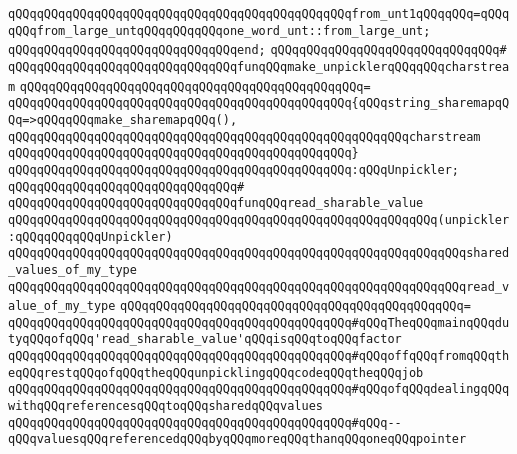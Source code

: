 \verb|qQQqqQQqqQQqqQQqqQQqqQQqqQQqqQQqqQQqqQQqqQQqqQQqfrom_unt1qQQqqQQq=qQQqqQQqfrom_large_untqQQqqQQqqQQqone_word_unt::from_large_unt;|\newline
\newline
\verb|qQQqqQQqqQQqqQQqqQQqqQQqqQQqqQQqend;|\newline
\newline
\verb|qQQqqQQqqQQqqQQqqQQqqQQqqQQqqQQq#|\newline
\verb|qQQqqQQqqQQqqQQqqQQqqQQqqQQqqQQqfunqQQqmake_unpicklerqQQqqQQqcharstream|\newline
\verb|qQQqqQQqqQQqqQQqqQQqqQQqqQQqqQQqqQQqqQQqqQQqqQQq=|\newline
\verb|qQQqqQQqqQQqqQQqqQQqqQQqqQQqqQQqqQQqqQQqqQQqqQQq{qQQqstring_sharemapqQQq=>qQQqqQQqmake_sharemapqQQq(),|\newline
\verb|qQQqqQQqqQQqqQQqqQQqqQQqqQQqqQQqqQQqqQQqqQQqqQQqqQQqqQQqcharstream|\newline
\verb|qQQqqQQqqQQqqQQqqQQqqQQqqQQqqQQqqQQqqQQqqQQqqQQq}|\newline
\verb|qQQqqQQqqQQqqQQqqQQqqQQqqQQqqQQqqQQqqQQqqQQqqQQq:qQQqUnpickler;|\newline
\newline
\newline
\verb|qQQqqQQqqQQqqQQqqQQqqQQqqQQqqQQq#|\newline
\verb|qQQqqQQqqQQqqQQqqQQqqQQqqQQqqQQqfunqQQqread_sharable_value|\newline
\verb|qQQqqQQqqQQqqQQqqQQqqQQqqQQqqQQqqQQqqQQqqQQqqQQqqQQqqQQqqQQq(unpickler:qQQqqQQqqQQqUnpickler)|\newline
\verb|qQQqqQQqqQQqqQQqqQQqqQQqqQQqqQQqqQQqqQQqqQQqqQQqqQQqqQQqqQQqqQQqshared_values_of_my_type|\newline
\verb|qQQqqQQqqQQqqQQqqQQqqQQqqQQqqQQqqQQqqQQqqQQqqQQqqQQqqQQqqQQqqQQqread_value_of_my_type|\newline
\verb|qQQqqQQqqQQqqQQqqQQqqQQqqQQqqQQqqQQqqQQqqQQqqQQq=|\newline
\verb|qQQqqQQqqQQqqQQqqQQqqQQqqQQqqQQqqQQqqQQqqQQqqQQq#qQQqTheqQQqmainqQQqdutyqQQqofqQQq'read_sharable_value'qQQqisqQQqtoqQQqfactor|\newline
\verb|qQQqqQQqqQQqqQQqqQQqqQQqqQQqqQQqqQQqqQQqqQQqqQQq#qQQqoffqQQqfromqQQqtheqQQqrestqQQqofqQQqtheqQQqunpicklingqQQqcodeqQQqtheqQQqjob|\newline
\verb|qQQqqQQqqQQqqQQqqQQqqQQqqQQqqQQqqQQqqQQqqQQqqQQq#qQQqofqQQqdealingqQQqwithqQQqreferencesqQQqtoqQQqsharedqQQqvalues|\newline
\verb|qQQqqQQqqQQqqQQqqQQqqQQqqQQqqQQqqQQqqQQqqQQqqQQq#qQQq--qQQqvaluesqQQqreferencedqQQqbyqQQqmoreqQQqthanqQQqoneqQQqpointer|\newline
